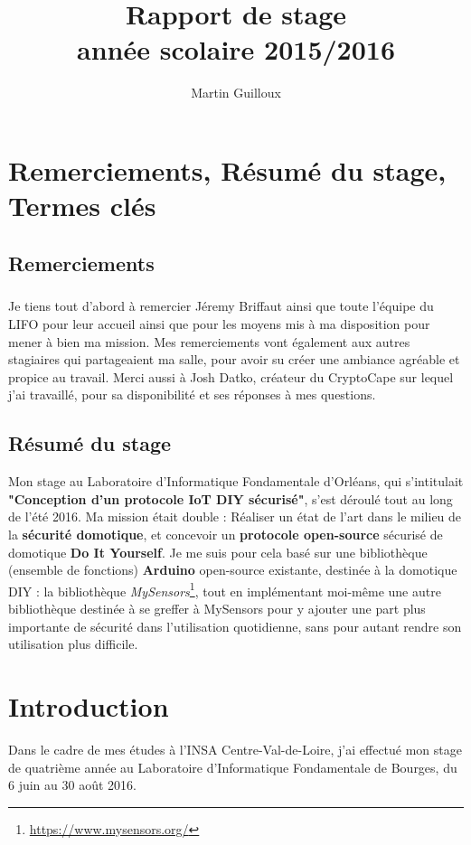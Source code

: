 \documentclass[12 pt]{report}
\title{\textbf{Rapport de stage \\année scolaire 2015/2016}}
\author{Martin Guilloux}
\begin{document}
\maketitle
\chapter{Remerciements, Résumé du stage, Termes clés}
\section{Remerciements}
\paragraph{}Je tiens tout d'abord à remercier Jéremy Briffaut ainsi que toute l'équipe du LIFO pour leur accueil ainsi que pour les moyens mis à ma disposition pour mener à bien ma mission. Mes remerciements vont également aux autres stagiaires qui partageaient ma salle, pour avoir su créer une ambiance agréable et propice au travail.
Merci aussi à Josh Datko, créateur du CryptoCape sur lequel j'ai travaillé, pour sa disponibilité et ses réponses à mes questions.

\section{Résumé du stage}
Mon stage au Laboratoire d'Informatique Fondamentale d'Orléans, qui s'intitulait \textbf{"Conception d'un protocole IoT DIY sécurisé"}, s'est déroulé tout au long de l'été 2016. Ma mission était double : Réaliser un état de l'art dans le milieu de la \textbf{sécurité domotique}, et concevoir un \textbf{protocole open-source} sécurisé de domotique \textbf{Do It Yourself}. Je me suis pour cela basé sur une bibliothèque (ensemble de fonctions) \textbf{Arduino} open-source existante, destinée à la domotique DIY : la bibliothèque \emph{MySensors}\footnote{\url{https://www.mysensors.org/}}, tout en implémentant moi-même une autre bibliothèque destinée à se greffer à MySensors pour y ajouter une part plus importante de sécurité dans l'utilisation quotidienne, sans pour autant rendre son utilisation plus difficile.


\tableofcontents
\chapter{Introduction}
Dans le cadre de mes études à l'INSA Centre-Val-de-Loire, j'ai effectué mon stage de quatrième année au Laboratoire d'Informatique Fondamentale de Bourges, du 6 juin au 30 août 2016.
\end{document}
